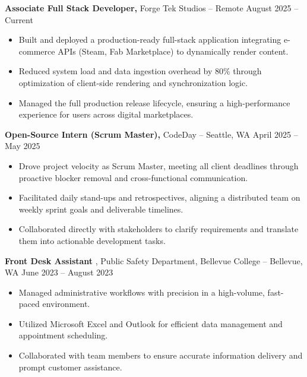 \documentclass[11pt]{article}       %
\begin{document}
\textbf{Associate Full Stack Developer,} {Forge Tek Studios} -- Remote \hfill August 2025 -- Current 
\vspace{-9pt}
\begin{itemize}
  \item Built and deployed a production-ready full-stack application integrating e-commerce APIs (Steam, Fab Marketplace) to dynamically render content.
  \item Reduced system load and data ingestion overhead by 80\% through optimization of client-side rendering and synchronization logic.
  \item Managed the full production release lifecycle, ensuring a high-performance experience for users across digital marketplaces.
\end{itemize}

\textbf{Open-Source Intern (Scrum Master),} {CodeDay} -- Seattle, WA \hfill April 2025 -- May 2025 \\
\vspace{-9pt}
\begin{itemize}
  \item Drove project velocity as Scrum Master, meeting all client deadlines through proactive blocker removal and cross-functional communication.
  \item Facilitated daily stand-ups and retrospectives, aligning a distributed team on weekly sprint goals and deliverable timelines.
  \item Collaborated directly with stakeholders to clarify requirements and translate them into actionable development tasks.
\end{itemize}

\textbf{Front Desk Assistant} {, Public Safety Department, Bellevue College} -- Bellevue, WA \hfill June 2023 -- August 2023 \\
\vspace{-9pt}
\begin{itemize}
  \item Managed administrative workflows with precision in a high-volume, fast-paced environment.
  \item Utilized Microsoft Excel and Outlook for efficient data management and appointment scheduling.
  \item Collaborated with team members to ensure accurate information delivery and prompt customer assistance.
\end{itemize}

\end{document}
